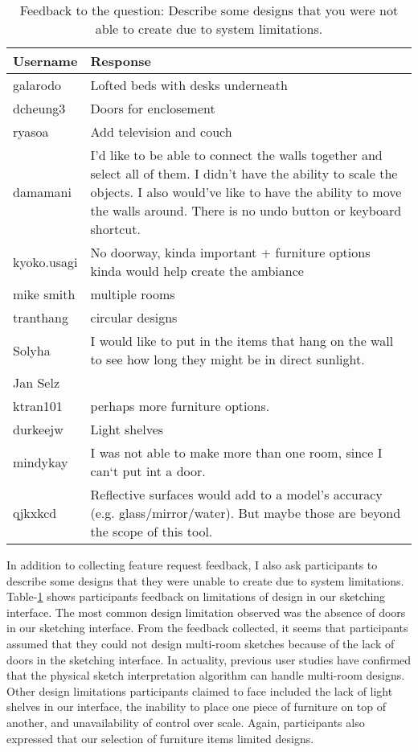 \begin{table}[h]
\centering
\begin{tabular}{|p{}|p{}|}
\hline
\rowcolor[HTML]{EFEFEF} 
\textbf{Username} & \textbf{Response} \\ \hline
galarodo & Lofted beds with desks underneath \\ \hline
dcheung3 & Doors for enclosement \\ \hline
ryasoa & Add television and couch \\ \hline
damamani & I'd like to be able to connect the walls together and select all of them. I didn't have the ability to scale the objects.  I also would've like to have the ability to move the walls around. There is no undo button or keyboard shortcut. \\ \hline
kyoko.usagi & No doorway, kinda important + furniture options kinda would help create the ambiance \\ \hline
mike smith & multiple rooms \\ \hline
tranthang & circular designs \\ \hline
Solyha & I would like to put in the items that hang on the wall to see how long they might be in direct sunlight. \\ \hline
Jan Selz &  \\ \hline
ktran101 & perhaps more furniture options. \\ \hline
durkeejw & Light shelves \\ \hline
mindykay & I was not able to make more than one room, since I can`t put int a door. \\ \hline
qjkxkcd & Reflective surfaces would add to a model's accuracy (e.g. glass/mirror/water). But maybe those are beyond the scope of this tool. \\ \hline
\end{tabular}
\caption{Feedback to the question: Describe some designs that you were not able to create due  to system limitations. }
\label{fig:limitation}
\end{table}

In addition to collecting feature request feedback, I also ask participants to describe some designs that they were unable to create due to system limitations.
Table-\ref{fig:limitation} shows participants feedback on limitations of design in our sketching interface.
The most common design limitation observed was the absence of doors in our sketching interface.
From the feedback collected, it seems that participants assumed that they could not design multi-room sketches because of the lack of doors in the sketching interface.
In actuality, previous user studies have confirmed that the physical sketch interpretation algorithm can handle multi-room designs\cite{}.
Other design limitations participants claimed to face included the lack of light shelves in our interface, the inability to place one piece of furniture on top of another, and unavailability of control over scale.
Again, participants also expressed that our selection of furniture items limited designs. \\


